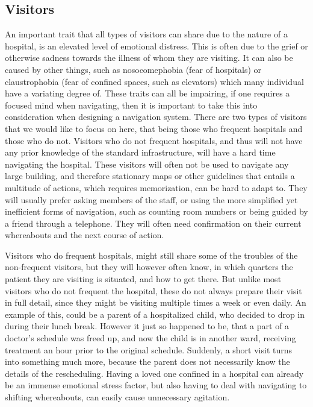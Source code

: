 \subsection{Visitors} %
 \label{par:vistors}
 
An important trait that all types of visitors can share due to the nature of a hospital, is an elevated level of emotional distress. This is often due to the grief or otherwise sadness towards the illness of whom they are visiting. It can also be caused by other things, such as nosocomephobia (fear of hospitals) or claustrophobia (fear of confined spaces, such as elevators) which many individual have a variating degree of\cite{individforskellige}. These traits can all be impairing, if one requires a focused mind when navigating, then it is important to take this into consideration when designing a navigation system. There are two types of visitors that we would like to focus on here, that being those who frequent hospitals and those who do not.
Visitors who do not frequent hospitals, and thus will not have any prior knowledge of the standard infrastructure, will have a hard time navigating the hospital. These visitors will often not be used to navigate any large building, and therefore stationary maps or other guidelines that entails a multitude of actions, which requires memorization, can be hard to adapt to. They will usually prefer asking members of the staff, or using the more simplified yet inefficient forms of navigation, such as counting room numbers or being guided by a friend through a telephone. They will often need confirmation on their current whereabouts and the next course of action\cite{naturtalenter,individforskelle}.

Visitors who do frequent hospitals, might still share some of the troubles of the non-frequent visitors, but they will however often know, in which quarters the patient they are visiting is situated, and how to get there. But unlike most visitors who do not frequent the hospital, these do not always prepare their visit in full detail, since they might be visiting multiple times a week or even daily. An example of this, could be a parent of a hospitalized child, who decided to drop in during their lunch break. However it just so happened to be, that a part of a doctor's schedule was freed up, and now the child is in another ward, receiving treatment an hour prior to the original schedule. Suddenly, a short visit turns into something much more, because the parent does not necessarily know the details of the rescheduling. Having a loved one confined in a hospital can already be an immense emotional stress factor, but also having to deal with navigating to shifting whereabouts, can easily cause unnecessary agitation.

